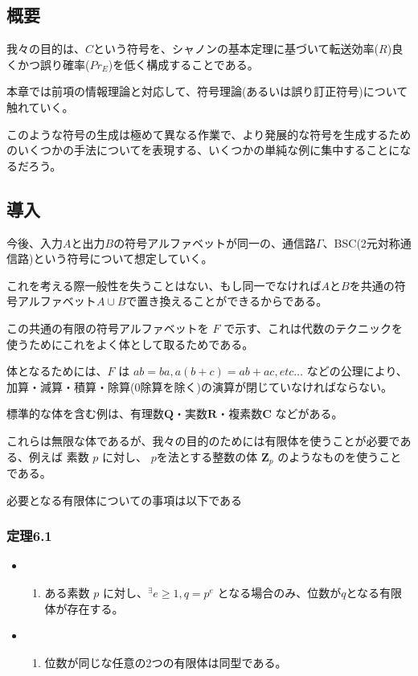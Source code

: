 \documentclass[12pt,a4paper]{article}
\def\tightlist{\itemsep1pt\parskip0pt\parsep0pt}
\begin{document}
\subsection*{概要}\label{ux6982ux8981}

我々の目的は、$C$という符号を、シャノンの基本定理に基づいて転送効率($R$)良くかつ誤り確率($Pr_E$)を低く構成することである。

本章では前項の情報理論と対応して、符号理論(あるいは誤り訂正符号)について触れていく。

このような符号の生成は極めて異なる作業で、より発展的な符号を生成するためのいくつかの手法についてを表現する、いくつかの単純な例に集中することになるだろう。

\subsection*{導入}\label{ux5c0eux5165}

今後、入力$A$と出力$B$の符号アルファベットが同一の、通信路$\Gamma$、BSC(2元対称通信路)という符号について想定していく。

これを考える際一般性を失うことはない、もし同一でなければ$A$と$B$を共通の符号アルファベット$A\cup B$で置き換えることができるからである。

この共通の有限の符号アルファベットを $F$
で示す、これは代数のテクニックを使うためにこれをよく体として取るためである。

体となるためには、$F$ は $ab = ba, a(b + c) = ab + ac, etc\dots$
などの公理により、加算・減算・積算・除算(0除算を除く)の演算が閉じていなければならない。

標準的な体を含む例は、有理数$\mathbf{Q}$・実数$\mathbf{R}$・複素数$\mathbf{C}$
などがある。

これらは無限な体であるが、我々の目的のためには有限体を使うことが必要である、例えば
素数 $p$ に対し、 $p$を法とする整数の体 $\mathbf{Z}_p$
のようなものを使うことである。

必要となる有限体についての事項は以下である

\subsubsection*{定理6.1}\label{ux5b9aux74066.1}

\begin{itemize}
\item
  \begin{enumerate}
  \def\labelenumi{(\alph{enumi})}
  \tightlist
  \item
    ある素数 $p$ に対し、${}^\exists e \geq 1 , q = p^e$
    となる場合のみ、位数が$q$となる有限体が存在する。
  \end{enumerate}
\item
  \begin{enumerate}
  \def\labelenumi{(\alph{enumi})}
  \setcounter{enumi}{1}
  \tightlist
  \item
    位数が同じな任意の2つの有限体は同型である。
  \end{enumerate}
\end{itemize}
\end{document}
